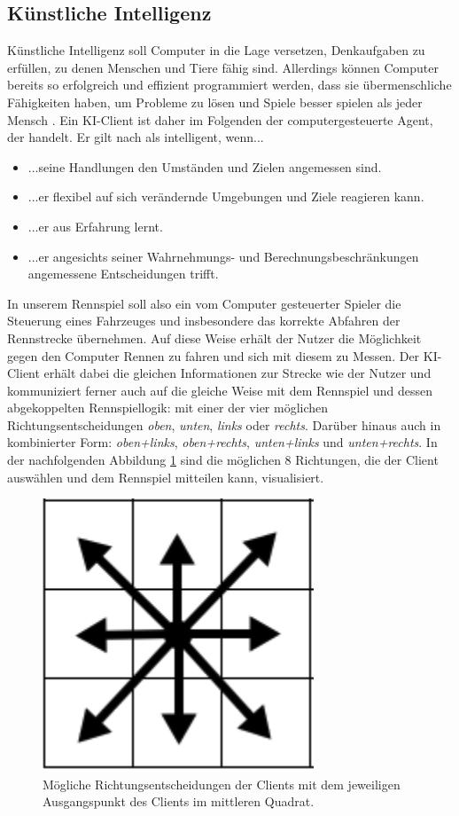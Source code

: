 \subsection{Künstliche Intelligenz}
Künstliche Intelligenz soll Computer in die Lage versetzen, Denkaufgaben zu erfüllen, zu denen Menschen und Tiere fähig sind.\newline
Allerdings können Computer bereits so erfolgreich und effizient programmiert werden, dass sie übermenschliche Fähigkeiten haben, um Probleme zu lösen und Spiele besser spielen als jeder Mensch \cite{10.5555/1795711}.\newline
Ein KI-Client ist daher im Folgenden der computergesteuerte Agent, der handelt. Er gilt nach \cite{Bartneck.2021} als intelligent, wenn... 
\begin{itemize}
    \item ...seine Handlungen den Umständen und Zielen angemessen sind. 
    \item ...er flexibel auf sich verändernde Umgebungen und Ziele reagieren kann.
    \item ...er aus Erfahrung lernt.
    \item ...er angesichts seiner Wahrnehmungs- und Berechnungsbeschränkungen angemessene Entscheidungen trifft.
\end{itemize}
In unserem Rennspiel soll also ein vom Computer gesteuerter Spieler die Steuerung eines Fahrzeuges und insbesondere das korrekte Abfahren der Rennstrecke übernehmen.\newline
Auf diese Weise erhält der Nutzer die Möglichkeit gegen den Computer Rennen zu fahren und sich mit diesem zu Messen.
Der KI-Client erhält dabei die gleichen Informationen zur Strecke wie der Nutzer und kommuniziert ferner auch auf die gleiche Weise mit dem Rennspiel und dessen abgekoppelten Rennspiellogik: mit einer der vier möglichen Richtungsentscheidungen \textit{oben}, \textit{unten}, \textit{links} oder \textit{rechts}.\newline
Darüber hinaus auch in kombinierter Form: \textit{oben+links}, \textit{oben+rechts}, \textit{unten+links} und \textit{unten+rechts}.\newline
In der nachfolgenden Abbildung \ref{fig:richtungen} sind die möglichen 8 Richtungen, die der Client auswählen und dem Rennspiel mitteilen kann, visualisiert.
\begin{figure}[h]
    \centering
    \includegraphics[scale=0.5]{pics/richtungen.png}
    \caption{Mögliche Richtungsentscheidungen der Clients mit dem jeweiligen Ausgangspunkt des Clients im mittleren Quadrat.}
    \label{fig:richtungen}
\end{figure}